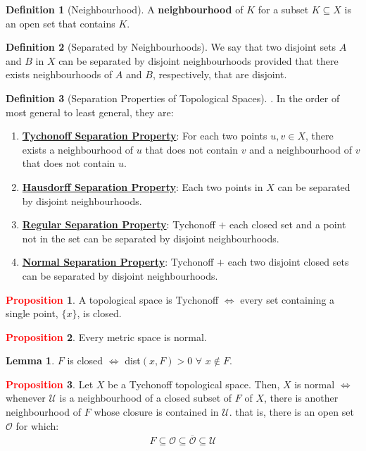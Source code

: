 \documentclass[11pt]{article}
\newcommand{\open}[0]{\mathcal{O}}
\newcommand{\hood}[0]{\mathcal{U}}
\theoremstyle{definition}
\theoremstyle{definition}
\newtheorem{lemma}[theorem]{Lemma}
\theoremstyle{definition}
\newtheorem{definition}{\textcolor{OliveGreen}{Definition}}
\newtheorem{prop}{\textcolor{red}{Proposition}}
\theoremstyle{remark}
\begin{document}
\begin{definition}[Neighbourhood]
	A \textbf{neighbourhood} of $K$ for a subset $K \subseteq X$ is an open set that contains $K$. 
\end{definition} 

\begin{definition}[Separated by Neighbourhoods]
	We say that two disjoint sets $A$ and $B$ in $X$ can be separated by disjoint neighbourhoods provided that there exists neighbourhoods of $A$ and $B$, respectively, that are disjoint. 
\end{definition}

\begin{definition}[Separation Properties of Topological Spaces]. In the order of most general to least general, they are: 
\begin{enumerate}[noitemsep]
	\item \underline{\textbf{Tychonoff Separation Property}}: For each two points $u, v \in X$, there exists a neighbourhood of $u$ that does not contain $v$ and a neighbourhood of $v$ that does not contain $u$. 
	\item \underline{\textbf{Hausdorff Separation Property}}: Each two points in $X$ can be separated by disjoint neighbourhoods. 
	\item \underline{\textbf{Regular Separation Property}}: Tychonoff $+$ each closed set and a point not in the set can be separated by disjoint neighbourhoods.
	\item \underline{\textbf{Normal Separation Property}}: Tychonoff $+$ each two disjoint closed sets can be separated by disjoint neighbourhoods. 
\end{enumerate}
\end{definition}

\begin{prop}
	A topological space is Tychonoff $\iff$ every set containing a single point, $\{ x \}$, is closed. 
\end{prop}

\begin{prop}
	Every metric space is normal.
\end{prop}

\begin{lemma}
	$F$ is closed $\iff$ dist$(x, F) > 0$ $\forall$ $ x \notin F$. 
\end{lemma}

\begin{prop}
	Let $X$ be a Tychonoff topological space. Then, $X$ is normal $\iff$ whenever $\hood$ is a neighbourhood of a closed subset of $F$ of $X$, there is another neighbourhood of $F$ whose closure is contained in $\hood$. that is, there is an open set $\open$ for which: 
	\begin{align}
		F \subseteq \open \subseteq \overline{\open} \subseteq \hood 
	\end{align}
\end{prop}
\end{document}
